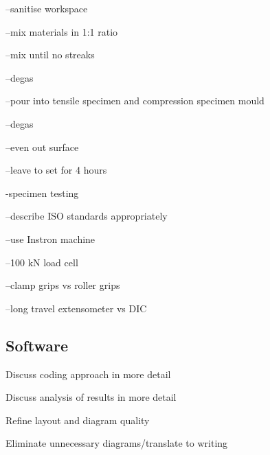 	--sanitise workspace
	
	--mix materials in 1:1 ratio
	
	--mix until no streaks
	
	--degas
	
	--pour into tensile specimen and compression specimen mould
	
	--degas
	
	--even out surface
	
	--leave to set for 4 hours
	
-specimen testing

	--describe ISO standards appropriately
	
	--use Instron machine
	
	--100 kN load cell
	
	--clamp grips vs roller grips
	
	--long travel extensometer vs DIC
	

\subsection{Software}

Discuss coding approach in more detail

Discuss analysis of results in more detail

Refine layout and diagram quality

Eliminate unnecessary diagrams/translate to writing
